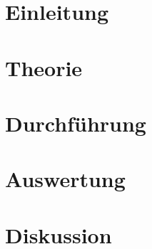
\section{Einleitung}				%
	
\section{Theorie}
	
\section{Durchführung}
	
\section{Auswertung}
	
\section{Diskussion}
	



